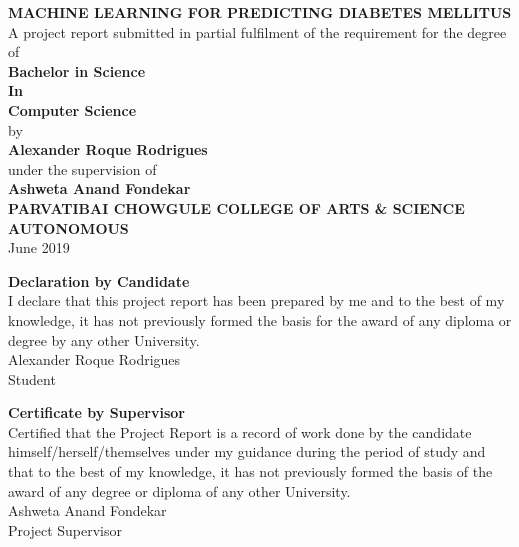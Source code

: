 \documentclass[12pt]{article}
\begin{document}
\begin{titlepage}
\newcommand{\HRule}{\rule{\linewidth}{0.5mm}} 
\center
\doublespacing
\textbf{\Huge MACHINE LEARNING FOR PREDICTING DIABETES MELLITUS}
\\
\singlespacing
\Large
\vspace{3cm}
A project report submitted in partial fulfilment of the requirement for the degree of\\
\vspace{1cm}
\textbf{Bachelor in Science\\In\\Computer Science}
\\by\\
\vspace{1cm}
\textbf{Alexander Roque Rodrigues}
\\
\normalsize
\vspace{1cm}
under the supervision of
\vspace{1cm}
\\
\LARGE
\textbf{Ashweta Anand Fondekar}
\\
\vspace{3cm}
\Large
\textbf{PARVATIBAI CHOWGULE COLLEGE OF ARTS \& SCIENCE AUTONOMOUS}
\\June 2019
\end{titlepage}

\onehalfspacing
\newpage
\vspace{15cm}
\begin{center}
\Huge{\textbf{Declaration by Candidate}}\\
\normalsize
\vspace{5cm}
I declare that this project report has been prepared by me and to the best of my
knowledge, it has not previously formed the basis for the award of any diploma or degree by
any other University.\\
\vspace{5cm}
Alexander Roque Rodrigues\\

Student
\end{center}
\newpage
\vspace{15cm}

\begin{center}
\Huge{\textbf{Certificate by Supervisor}}\\
\normalsize
\vspace{5cm}
Certified that the Project Report is a record of work done by the candidate himself/herself/themselves under my guidance during the period of study and that to the best of my knowledge, it has not previously formed the basis of the award of any degree or diploma of any other University.\\
\vspace{5cm}
Ashweta Anand Fondekar\\

Project Supervisor
\end{center}
\end{document}
